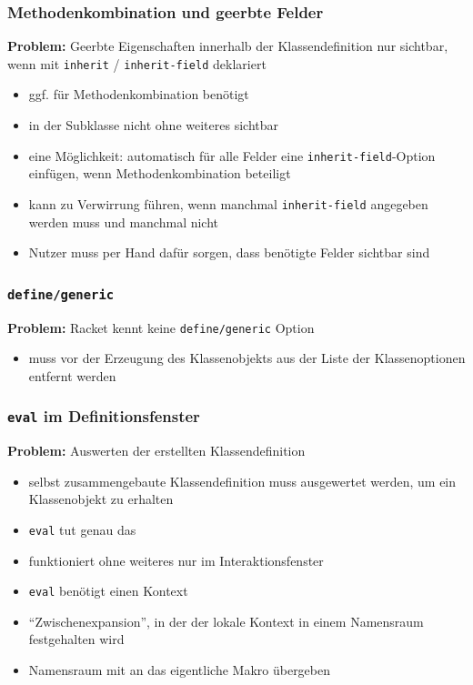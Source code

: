\documentclass{beamer}
\begin{document}
\begin{frame}
 \frametitle{Methodenkombination und geerbte Felder}
 \textbf{Problem:} Geerbte Eigenschaften innerhalb der Klassendefinition nur sichtbar, wenn mit \texttt{inherit} / \texttt{inherit-field} deklariert
 \vspace{0.5cm}
 \begin{itemize}
  \item ggf. für Methodenkombination benötigt
  \item in der Subklasse nicht ohne weiteres sichtbar
  \item eine Möglichkeit: automatisch für alle Felder eine \texttt{inherit-field}-Option einfügen, wenn Methodenkombination beteiligt
  \item kann zu Verwirrung führen, wenn manchmal \texttt{inherit-field} angegeben werden muss und manchmal nicht
  \item[\textbf{\textrightarrow}] Nutzer muss per Hand dafür sorgen, dass benötigte Felder sichtbar sind
 \end{itemize}
\end{frame}

\begin{frame}
 \frametitle{\texttt{define/generic}}
 \textbf{Problem:} Racket kennt keine \texttt{define/generic} Option
 \vspace{0.5cm}
 \begin{itemize}
  \item[\textbf{\textrightarrow}] muss vor der Erzeugung des Klassenobjekts aus der Liste der Klassenoptionen entfernt werden
 \end{itemize}
\end{frame}

\begin{frame}
 \frametitle{\texttt{eval} im Definitionsfenster}
 \textbf{Problem:} Auswerten der erstellten Klassendefinition
 \vspace{0.5cm}
 \begin{itemize}
  \item selbst zusammengebaute Klassendefinition muss ausgewertet werden, um ein Klassenobjekt zu erhalten
  \item \texttt{eval} tut genau das
  \item funktioniert ohne weiteres nur im Interaktionsfenster
  \item \texttt{eval} benötigt einen Kontext
  \item[\textbf{\textrightarrow}] ``Zwischenexpansion'', in der der lokale Kontext in einem Namensraum festgehalten wird
  \item[\textbf{\textrightarrow}] Namensraum mit an das eigentliche Makro übergeben
 \end{itemize}
\end{frame}
\end{document}

